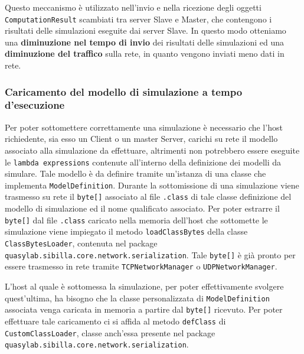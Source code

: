 Questo meccanismo è utilizzato nell'invio e nella ricezione degli oggetti \texttt{ComputationResult} scambiati tra server Slave e Master, che contengono i risultati delle simulazioni eseguite dai server Slave. In questo modo otteniamo una \textbf{diminuzione nel tempo di invio} dei risultati delle simulazioni ed una \textbf{diminuzione del traffico} sulla rete, in quanto vengono inviati meno dati in rete.

\subsubsection{Caricamento del modello di simulazione a tempo d'esecuzione}
Per poter sottomettere correttamente una simulazione è necessario che l'host richiedente, sia esso un Client o un master Server, carichi su rete il modello associato alla simulazione da effettuare, altrimenti non potrebbero essere eseguite le \texttt{lambda expressions} contenute all'interno della definizione dei modelli da simulare. Tale modello è da definire tramite un'istanza di una classe che implementa \texttt{ModelDefinition}.
Durante la sottomissione di una simulazione viene trasmesso su rete il \texttt{byte[]} associato al file \texttt{.class} di tale classe definizione del modello di simulazione ed il nome qualificato associato. Per poter estrarre il \texttt{byte[]} dal file \texttt{.class} caricato nella memoria dell'host che sottomette le simulazione viene impiegato il metodo \texttt{loadClassBytes} della classe \texttt{ClassBytesLoader}, contenuta nel package \texttt{quasylab.sibilla.core.network.serialization}. Tale \texttt{byte[]} è già pronto per essere trasmesso in rete tramite \texttt{TCPNetworkManager} o \texttt{UDPNetworkManager}.

L'host al quale è sottomessa la simulazione, per poter effettivamente svolgere quest'ultima, ha bisogno che la classe personalizzata di \texttt{ModelDefinition} associata venga caricata in memoria a partire dal \texttt{byte[]} ricevuto. Per poter effettuare tale caricamento ci si affida al metodo \texttt{defClass} di \texttt{CustomClassLoader}, classe anch'essa presente nel package \texttt{quasylab.sibilla.core.network.serialization}. 

